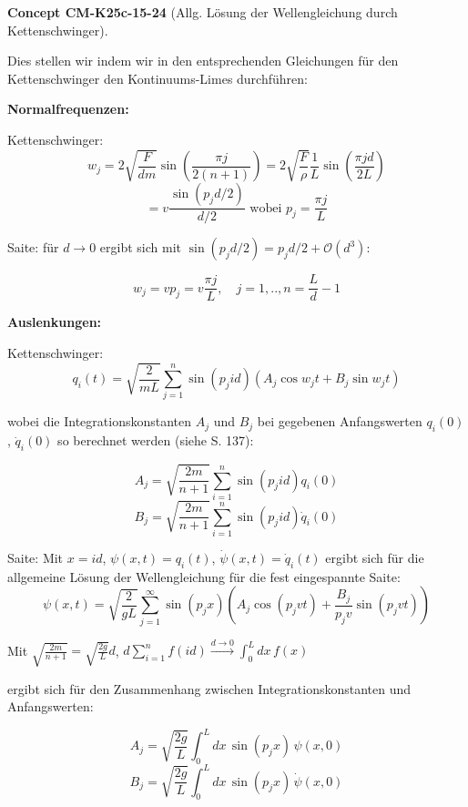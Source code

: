 \documentclass[10pt, letterpaper]{article}
\newcommand{\CustomHeading}[3]{%
  \par\medskip\noindent%
  \textbf{#1 #2} \textnormal{(#3)}.\enskip%
}
\newenvironment{CONC}[2]{\CustomHeading{Concept}{#1}{#2}}{}
\begin{document}
\begin{CONC}{CM-K25c-15-24}{Allg. Lösung der Wellengleichung durch Kettenschwinger}
Dies stellen wir indem wir in den entsprechenden Gleichungen für den Kettenschwinger den Kontinuums-Limes durchführen:

\textbf{Normalfrequenzen:}

Kettenschwinger: \[w_j = 2\sqrt{\frac{F}{dm}}\sin\left(\frac{\pi j}{2(n+1)}\right) = 2\sqrt{\frac{F}{\rho}}\frac{1}{L}\sin\left(\frac{\pi j d}{2L}\right)\]
\[= v\frac{\sin(p_j d/2)}{d/2} \text{ wobei } p_j = \frac{\pi j}{L}\]

Saite: für $d\to 0$ ergibt sich mit $\sin(p_j d/2) = p_j d/2 + \mathcal{O}(d^3)$:

\[w_j = vp_j = v\frac{\pi j}{L}, \quad j=1,..,n=\frac{L}{d}-1\]

\textbf{Auslenkungen:}

Kettenschwinger: \[q_i(t) = \sqrt{\frac{2}{mL}}\sum_{j=1}^n\sin(p_j id)(A_j\cos w_jt + B_j\sin w_jt)\]

wobei die Integrationskonstanten $A_j$ und $B_j$ bei gegebenen Anfangswerten $q_i(0)$, $\dot{q}_i(0)$ so berechnet werden (siehe S. 137):

\[A_j = \sqrt{\frac{2m}{n+1}}\sum_{i=1}^n\sin(p_j id)q_i(0)\]
\[B_j = \sqrt{\frac{2m}{n+1}}\sum_{i=1}^n\sin(p_j id)\dot{q}_i(0)\]

Saite: Mit $x = id$, $\psi(x,t) = q_i(t)$, $\dot{\psi}(x,t) = \dot{q}_i(t)$ ergibt sich für die allgemeine Lösung der Wellen\-gleichung für die fest eingespannte Saite:
\[\psi(x,t) = \sqrt{\frac{2}{gL}}\sum_{j=1}^\infty \sin(p_j x)\left(A_j\cos(p_j vt) + \frac{B_j}{p_j v}\sin(p_j vt)\right)\]

Mit $\sqrt{\frac{2m}{n+1}} = \sqrt{\frac{2g}{L}}d$, $d\sum_{i=1}^n f(id) \xrightarrow{d\to 0} \int_0^L dx\, f(x)$

ergibt sich für den Zusammenhang zwischen Integrationskonstanten und Anfangswerten:

\[A_j = \sqrt{\frac{2g}{L}}\int_0^L dx\,\sin(p_j x)\,\psi(x,0)\]
\[B_j = \sqrt{\frac{2g}{L}}\int_0^L dx\,\sin(p_j x)\,\dot{\psi}(x,0)\]
\end{CONC}
\end{document}
